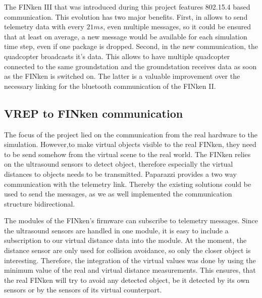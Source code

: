 The FINken III that was introduced during this project features 802.15.4 based communication.
This evolution has two major benefits.
First, in allows to send telemetry data with every $21ms$, even multiple messages, so it could be ensured that at least on average, a new message would be available for each simulation time step, even if one package is dropped.
Second, in the new communication, the quadcopter broadcasts it's data.
This allows to have multiple quadcopter connected to the same groundstation and the groundstation receives data as soon as the FINken is switched on.
The latter is a valuable improvement over the necessary linking for the bluetooth communication of the FINken II.



\subsection{VREP to FINken communication}
The focus of the project lied on the communication from the real hardware to the simulation.
However,to make virtual objects visible to the real FINken, they need to be send somehow from the virtual scene to the real world.
The FINken relies on the ultrasound sensors to detect object, therefore especially the virtual distances to objects needs to be transmitted.
Paparazzi provides a two way communication with the telemetry link.
Thereby the existing solutions could be used to send the messages, as we as well implemented the communication structure bidirectional.

The modules of the FINken's firmware can subscribe to telemetry messages.
Since the ultrasound sensors are handled in one module, it is easy to include a subscription to our virtual distance data into the module.
At the moment, the distance sensor are only used for collision avoidance, so only the closer object is interesting.
Therefore, the integration of the virtual values was done by using the minimum value of the real and virtual distance measurements.
This ensures, that the real FINken will try to avoid any detected object, be it detected by its own sensors or by the sensors of its virtual counterpart.



